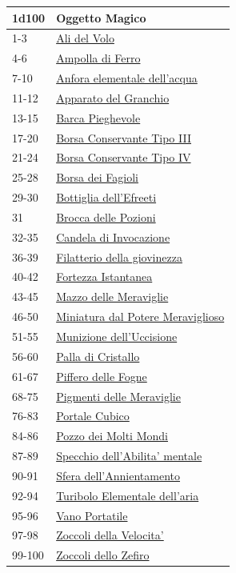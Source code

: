 \begin{multicols}{2}
{{\small\begin{tabularx}{\linewidth}{ll}
		\toprule
\textbf{1d100} & \textbf{Oggetto Magico}\\
\toprule
1-3 & \hyperlink{Ali del Volo}{Ali del Volo}\\
4-6 & \hyperlink{Ampolla di Ferro}{Ampolla di Ferro}\\
7-10 & \hyperlink{Anfora elementale dell'acqua}{Anfora elementale dell'acqua}\\
11-12 & \hyperlink{Apparato del Granchio}{Apparato del Granchio}\\
13-15 & \hyperlink{Barca Pieghevole}{Barca Pieghevole}\\
17-20 & \hyperlink{Borsa Conservante Tipo III}{Borsa Conservante Tipo III}\\
21-24 & \hyperlink{Borsa Conservante Tipo IV}{Borsa Conservante Tipo IV}\\
25-28 & \hyperlink{Borsa dei Fagioli}{Borsa dei Fagioli}\\
29-30 & \hyperlink{Bottiglia dell'Efreeti}{Bottiglia dell'Efreeti}\\
31 & \hyperlink{Brocca delle Pozioni}{Brocca delle Pozioni}\\
32-35 & \hyperlink{Candela di Invocazione}{Candela di Invocazione}\\
36-39 & \hyperlink{Filatterio della giovinezza}{Filatterio della giovinezza}\\
40-42 & \hyperlink{Fortezza Istantanea}{Fortezza Istantanea}\\
43-45 & \hyperlink{Mazzo delle Meraviglie}{Mazzo delle Meraviglie}\\
46-50 & \hyperlink{Miniatura dal Potere Meraviglioso}{Miniatura dal Potere Meraviglioso}\\
51-55 & \hyperlink{Munizione dell'Uccisione}{Munizione dell'Uccisione}\\
56-60 & \hyperlink{Palla di Cristallo}{Palla di Cristallo}\\
61-67 & \hyperlink{Piffero delle Fogne}{Piffero delle Fogne}\\
68-75 & \hyperlink{Pigmenti delle Meraviglie}{Pigmenti delle Meraviglie}\\
76-83 & \hyperlink{Portale Cubico}{Portale Cubico}\\
84-86 & \hyperlink{Pozzo dei Molti Mondi}{Pozzo dei Molti Mondi}\\
87-89 & \hyperlink{Specchio dell'Abilita' mentale}{Specchio dell'Abilita' mentale}\\
90-91 & \hyperlink{Sfera dell'Annientamento}{Sfera dell'Annientamento}\\
92-94 & \hyperlink{Turibolo Elementale dell'aria}{Turibolo Elementale dell'aria}\\
95-96 & \hyperlink{Vano Portatile}{Vano Portatile}\\
97-98 & \hyperlink{Zoccoli della Velocita'}{Zoccoli della Velocita'}\\
99-100 & \hyperlink{Zoccoli dello Zefiro}{Zoccoli dello Zefiro}
\end{tabularx}}

}
\end{multicols}
